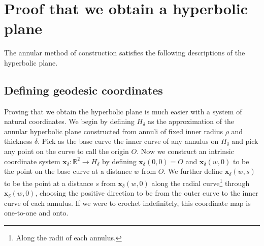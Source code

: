 \documentclass[letterpaper,titlepage]{article}
\begin{document}
\section{Proof that we obtain a hyperbolic plane}
The annular method of construction satisfies the following descriptions of the hyperbolic plane.
\subsection{Defining geodesic coordinates}
\label{geodesics}
Proving that we obtain the hyperbolic plane is much easier with a system of natural coordinates.
We begin by defining $H_\delta$ as the approximation of the annular hyperbolic plane constructed from annuli of fixed inner radius $\rho$ and thickness $\delta$.
Pick as the base curve the inner curve of any annulus on $H_\delta$ and pick any point on the curve to call the origin $O$.
Now we construct an intrinsic coordinate system $\mathbf{x}_\delta : \mathbb{R}^2 \to H_\delta$ by defining $\mathbf{x}_\delta(0,0) = O$ and $\mathbf{x}_\delta(w,0)$ to be the point on the base curve at a distance $w$ from $O$.
We further define $\mathbf{x}_\delta(w,s)$ to be the point at a distance $s$ from $\mathbf{x}_\delta(w,0)$ along the radial curve\footnote{Along the radii of each annulus.} through $\mathbf{x}_\delta(w,0)$, choosing the positive direction to be from the outer curve to the inner curve of each annulus.
If we were to crochet indefinitely, this coordinate map is one-to-one and onto.
\end{document}
